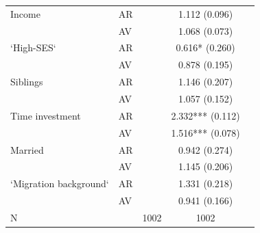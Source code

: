 \documentclass[notes, 12.5pt, aspectratio=169]{beamer}
\begin{document}
\begin{frame}[label=appendix_1]{}
{\begin{tabular}[t]{llccc}
			Income & AR &  & 1.112 (0.096)\\
			& AV &  & 1.068 (0.073)\\
			
			`High-SES` & AR &  & 0.616* (0.260)\\
			& AV &  & 0.878 (0.195)\\
			
			Siblings & AR &  & 1.146 (0.207)\\
			& AV &  & 1.057 (0.152)\\
			
			Time investment & AR &  & 2.332*** (0.112)\\
			& AV &  & 1.516*** (0.078)\\
			
			Married & AR &  & 0.942 (0.274)\\
			& AV &  & 1.145 (0.206)\\
			`Migration background` & AR &  & 1.331 (0.218)\\
			& AV &  & 0.941 (0.166)\\
			\midrule
			N &  & 1002 & 1002\\
			\bottomrule
		\end{tabular}
	}
	\hyperlink{main_results}{}
\end{frame}
\end{document}

